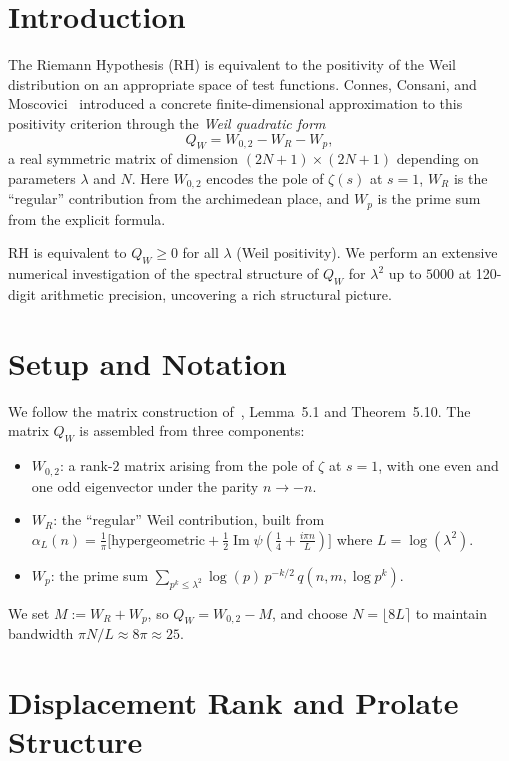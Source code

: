 \documentclass[11pt,a4paper]{article}
\begin{document}
\section{Introduction}

The Riemann Hypothesis (RH) is equivalent to the positivity of the Weil distribution on an appropriate space of test functions. Connes, Consani, and Moscovici~\cite{CCM2025} introduced a concrete finite-dimensional approximation to this positivity criterion through the \emph{Weil quadratic form}
\[
Q_W = W_{0,2} - W_R - W_p,
\]
a real symmetric matrix of dimension $(2N+1) \times (2N+1)$ depending on parameters $\lambda$ and $N$. Here $W_{0,2}$ encodes the pole of $\zeta(s)$ at $s=1$, $W_R$ is the ``regular'' contribution from the archimedean place, and $W_p$ is the prime sum from the explicit formula.

RH is equivalent to $Q_W \geq 0$ for all $\lambda$ (Weil positivity). We perform an extensive numerical investigation of the spectral structure of $Q_W$ for $\lambda^2$ up to $5000$ at 120-digit arithmetic precision, uncovering a rich structural picture.

\section{Setup and Notation}

We follow the matrix construction of~\cite{CCM2025}, Lemma~5.1 and Theorem~5.10. The matrix $Q_W$ is assembled from three components:

\begin{itemize}
\item $W_{0,2}$: a rank-$2$ matrix arising from the pole of $\zeta$ at $s=1$, with one even and one odd eigenvector under the parity $n \to -n$.
\item $W_R$: the ``regular'' Weil contribution, built from $\alpha_L(n) = \frac{1}{\pi}\bigl[\text{hypergeometric} + \frac{1}{2}\operatorname{Im}\psi(\tfrac{1}{4} + \tfrac{i\pi n}{L})\bigr]$ where $L = \log(\lambda^2)$.
\item $W_p$: the prime sum $\sum_{p^k \leq \lambda^2} \log(p)\, p^{-k/2}\, q(n,m,\log p^k)$.
\end{itemize}

We set $M := W_R + W_p$, so $Q_W = W_{0,2} - M$, and choose $N = \lfloor 8L \rceil$ to maintain bandwidth $\pi N / L \approx 8\pi \approx 25$.

\section{Displacement Rank and Prolate Structure}
\end{document}
